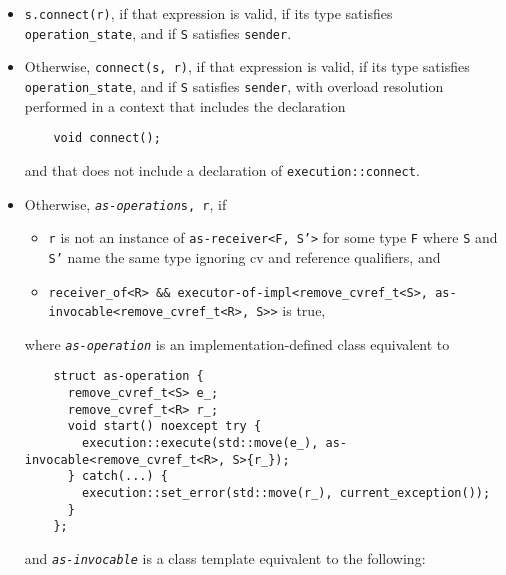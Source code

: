 \documentclass[a4paper,12pt,notitlepage,twoside,openright]{article}
\begin{document}
\begin{itemize}
\item
  \texttt{s.connect(r)}, if that expression is valid, if its
  type satisfies \texttt{operation_state}, and if
  \texttt{S} satisfies \texttt{sender}.
\item
  Otherwise, \texttt{connect(s, r)}, if that expression is
  valid, if its type satisfies \texttt{operation_state}, and
  if \texttt{S} satisfies \texttt{sender}, with
  overload resolution performed in a context that includes the
  declaration

  \begin{verbatim}
    void connect();
  \end{verbatim}

  and that does not include a declaration of
  \texttt{execution::connect}.
\item
  Otherwise,
  \emph{\texttt{as-operation}}\texttt{{s, r}},
  if

  \begin{itemize}
  \item
    \texttt{r} is not an instance of
    \texttt{as-receiver<F, S'>} for some type
    \texttt{F} where \texttt{S} and
    \texttt{S'} name the same type ignoring cv and reference
    qualifiers, and
  \item
    \texttt{receiver_of<R> && executor-of-impl<remove_cvref_t<S>, as-invocable<remove_cvref_t<R>, S>>}
    is true,
  \end{itemize}

  where \emph{\texttt{as-operation}} is an
  implementation-defined class equivalent to

  \begin{verbatim}
    struct as-operation {
      remove_cvref_t<S> e_;
      remove_cvref_t<R> r_;
      void start() noexcept try {
        execution::execute(std::move(e_), as-invocable<remove_cvref_t<R>, S>{r_});
      } catch(...) {
        execution::set_error(std::move(r_), current_exception());
      }
    };
  \end{verbatim}

  and \emph{\texttt{as-invocable}} is a class template
  equivalent to the following:


\end{itemize}
\end{document}
